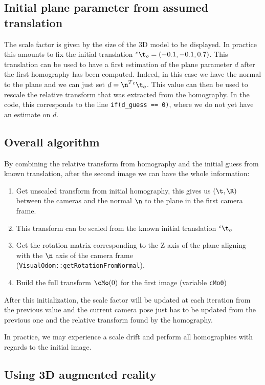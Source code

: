 \documentclass{ecnreport}
\begin{document}
\subsection{Initial plane parameter from assumed translation}
\label{sec:init}

The scale factor is given by the size of the 3D model to be displayed. In practice this amounts to fix the initial translation ${}^c\t_o = (-0.1,-0.1,0.7)$.
This translation can be used to have a first estimation of the plane parameter $d$ after the first homography has been computed.
Indeed, in this case we have the normal to the plane and we can just set $d = \n^T{}^c\t_o$. This value can then be used to rescale the relative transform 
that was extracted from the homography. 
In the code, this corresponds to the line \texttt{if(d\_guess == 0)}, where we do not yet have an estimate on $d$.

\subsection{Overall algorithm}

By combining the relative transform from homography and the initial guess from known translation, after the second image we can have the whole information:
\begin{enumerate}
 \item Get unscaled transform from initial homography, this gives us $(\t,\R)$ between the cameras and the normal $\n$ to the plane in the first camera frame.
 \item This transform can be scaled from the known initial translation ${}^c\t_o$
 \item Get the rotation matrix corresponding to the Z-axis of the plane aligning with the $\n$ axis of the camera frame (\texttt{VisualOdom::getRotationFromNormal}). 
 \item Build the full transform $\cMo(0)$ for the first image (variable \texttt{cMo0})
\end{enumerate}

After this initialization, the scale factor will be updated at each iteration from the previous value and the current camera pose just has to be updated from the previous one and the relative
transform found by the homography.

In practice, we may experience a scale drift and perform all homographies with regards to the initial image.

\subsection{Using 3D augmented reality}
\end{document}
